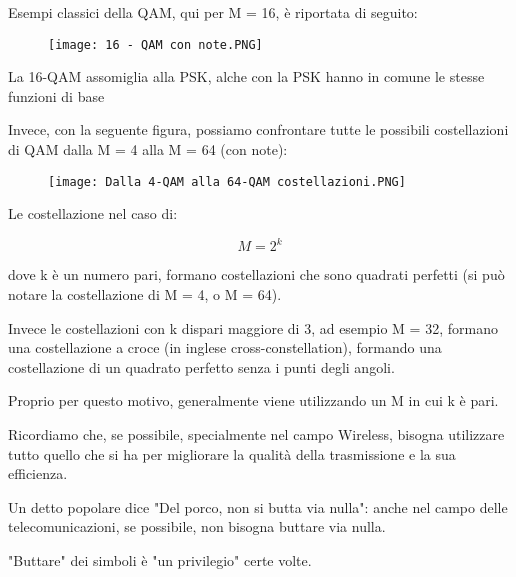 Esempi classici della QAM, qui per M = 16, è riportata di seguito: 

\begin{figure}[h]
    \centering
    \texttt{[image: 16 - QAM con note.PNG]}
\end{figure}

\begin{tcolorbox}
La 16-QAM assomiglia alla PSK, alche con la PSK hanno in comune le stesse funzioni di base    
\end{tcolorbox}

Invece, con la seguente figura, possiamo confrontare tutte le possibili costellazioni di QAM dalla M = 4 alla M = 64 (con note): 

\begin{figure}[h]
    \centering
    \texttt{[image: Dalla 4-QAM alla 64-QAM costellazioni.PNG]}
\end{figure}

Le costellazione nel caso di: 

{
    \Large
    \begin{equation}
        M = 2^{k}
    \end{equation}
}

dove k è un numero pari, formano costellazioni che sono quadrati perfetti (si può notare la costellazione di M = 4, o M = 64). \newline 

Invece le costellazioni con k dispari maggiore di 3, ad esempio M = 32, 
formano una costellazione a croce (in inglese cross-constellation), 
formando una costellazione di un quadrato perfetto senza i punti degli angoli. \newline 

\begin{tcolorbox}
    Proprio per questo motivo, generalmente viene utilizzando un M in cui k è pari. \newline 

    Ricordiamo che, se possibile, specialmente nel campo Wireless, bisogna utilizzare tutto quello che si ha per migliorare la qualità della trasmissione e la sua efficienza. \newline 

    Un detto popolare dice "Del porco, non si butta via nulla": anche nel campo delle telecomunicazioni, se possibile, non bisogna buttare via nulla. \newline 

    "Buttare" dei simboli è "un privilegio" certe volte. 
\end{tcolorbox}

